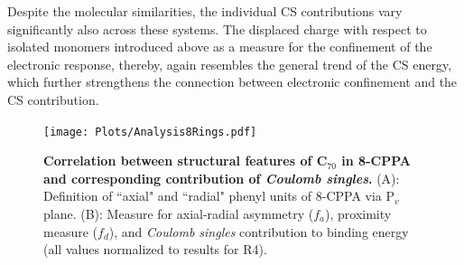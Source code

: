 \documentclass[aps,prl,groupaddress, twocolumn]{revtex4-1}
\begin{document}
Despite the molecular similarities, the individual CS contributions vary significantly also across these systems.
The displaced charge with respect to isolated monomers introduced above as a measure for the confinement of the electronic response, thereby, again resembles the general trend of the CS energy, which further strengthens the connection between electronic confinement and the CS contribution.
\begin{figure}[htp]
\texttt{[image: Plots/Analysis8Rings.pdf]}
\caption{\textbf{Correlation between structural features of C$_{70}$ in 8-CPPA and corresponding contribution of \emph{Coulomb singles}.} (A): Definition of ``axial" and ``radial" phenyl units of 8-CPPA via P$_v$ plane. (B): Measure for axial-radial asymmetry ($f_a$), proximity measure ($f_d$), and \emph{Coulomb singles} contribution to binding energy (all values normalized to results for R4).}\label{fig:analysis_rings}
\end{figure}
\end{document}
